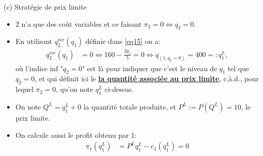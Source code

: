 \begin{frame}[allowframebreaks]{(c) Stratégie de prix limite}
\begin{itemize}
\item 2 n'a que des coût variables et ce faisant $\pi_2 = 0 \Leftrightarrow q_2 = 0$.  
\item En utilisant  $q_2^{mr}(q_1)$ définie dans \eqref{eq15} on a: 
\begin{align*}
    q_2^{mr}(q_1) &= 0 \Leftrightarrow 160 - \frac{2q_1}{5} = 0 \Leftrightarrow q_{(1, q_2=0)} = 400=:q_1^L,
\end{align*}
où l'indice inf "$q_2=0$" est là pour indiquer que c'est le niveau de $q_1$ tel que $q_2=0$,  et 
qui définit ici le \textbf{\underline{la quantité associée au prix limite}}, c.à.d., pour lequel $\pi_2=0$, qu'on note $q_1^L$ ci-dessus. 
\item On note $Q^L = q_1^L + 0$ la quantité totale produite, et $P^L:=P(Q^L) = 10$, le prix limite.
\item On calcule aussi le profit obtenu par 1: 
\begin{align*}
    \pi_1(q_1^L)&=P^L q_1^L - c_1(q_1^L) = 0
\end{align*}
\end{itemize}
\end{frame}

